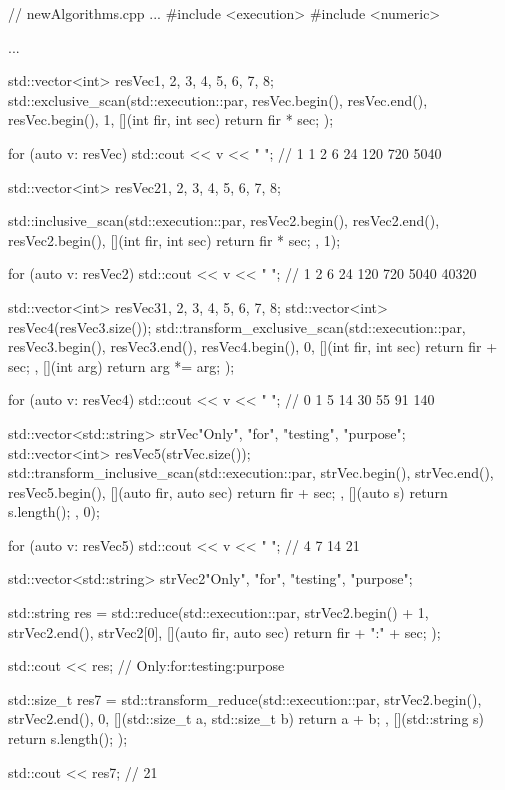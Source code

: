 \begin{cpp}
// newAlgorithms.cpp
...
#include <execution>
#include <numeric>

...

std::vector<int> resVec{1, 2, 3, 4, 5, 6, 7, 8};
std::exclusive_scan(std::execution::par,
					resVec.begin(), resVec.end(), resVec.begin(), 1,
					[](int fir, int sec){ return fir * sec; });

for (auto v: resVec) std::cout << v << " "; // 1 1 2 6 24 120 720 5040

std::vector<int> resVec2{1, 2, 3, 4, 5, 6, 7, 8};

std::inclusive_scan(std::execution::par,
					resVec2.begin(), resVec2.end(), resVec2.begin(),
					[](int fir, int sec){ return fir * sec; }, 1);

for (auto v: resVec2) std::cout << v << " "; // 1 2 6 24 120 720 5040 40320

std::vector<int> resVec3{1, 2, 3, 4, 5, 6, 7, 8};
std::vector<int> resVec4(resVec3.size());
std::transform_exclusive_scan(std::execution::par,
							  resVec3.begin(), resVec3.end(),
							  resVec4.begin(), 0,
							  [](int fir, int sec){ return fir + sec; },
							  [](int arg){ return arg *= arg; });

for (auto v: resVec4) std::cout << v << " "; // 0 1 5 14 30 55 91 140

std::vector<std::string> strVec{"Only", "for", "testing", "purpose"};
std::vector<int> resVec5(strVec.size());
std::transform_inclusive_scan(std::execution::par,
							  strVec.begin(), strVec.end(),
							  resVec5.begin(),
							  [](auto fir, auto sec){ return fir + sec; },
							  [](auto s){ return s.length(); }, 0);

for (auto v: resVec5) std::cout << v << " "; // 4 7 14 21

std::vector<std::string> strVec2{"Only", "for", "testing", "purpose"};

std::string res = std::reduce(std::execution::par,
						strVec2.begin() + 1, strVec2.end(), strVec2[0],
						[](auto fir, auto sec){ return fir + ":" + sec; });

std::cout << res; // Only:for:testing:purpose

std::size_t res7 = std::transform_reduce(std::execution::par,
						strVec2.begin(), strVec2.end(), 0,
						[](std::size_t a, std::size_t b){ return a + b; },
						[](std::string s){ return s.length(); });

std::cout << res7; // 21
\end{cpp}














